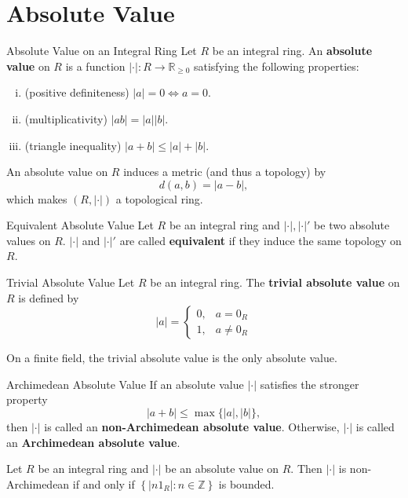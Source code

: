 \section{Absolute Value}
\begin{definition}{Absolute Value on an Integral Ring}{}
    Let $R$ be an integral ring. An \textbf{absolute value} on $R$ is a function $|\cdot|:R\to \mathbb{R}_{\ge0}$ satisfying the following properties:
    \begin{enumerate}[(i)]
        \item (positive definiteness) $|a|=0\iff a=0$.
        \item (multiplicativity) $|ab|=|a||b|$.
        \item (triangle inequality) $|a+b|\le |a|+|b|$.
    \end{enumerate}
\end{definition}

An absolute value on $R$ induces a metric (and thus a topology) by 
\[
    d(a,b)=|a-b|,
\]
which makes $(R,|\cdot|)$ a topological ring. 
\begin{definition}{Equivalent Absolute Value}{}
    Let $R$ be an integral ring and $|\cdot|,|\cdot|'$ be two absolute values on $R$. $|\cdot|$ and $|\cdot|'$ are called \textbf{equivalent} if they induce the same topology on $R$.
\end{definition}

\begin{definition}{Trivial Absolute Value}{}
    Let $R$ be an integral ring. The \textbf{trivial absolute value} on $R$ is defined by 
    \[
        |a|=\begin{cases}
            0, & a=0_R\\
            1, & a\ne 0_R
        \end{cases}
    \]
\end{definition}

On a finite field, the trivial absolute value is the only absolute value.
\begin{definition}{Archimedean Absolute Value}{}
    If an absolute value $|\cdot|$ satisfies the stronger property 
    \[
        |a+b|\le \max\{|a|,|b|\},
    \]
    then $|\cdot|$ is called an \textbf{non-Archimedean absolute value}. Otherwise, $|\cdot|$ is called an \textbf{Archimedean absolute value}.
\end{definition}

\begin{proposition}{}{}
    Let $R$ be an integral ring and $|\cdot|$ be an absolute value on $R$. Then $|\cdot|$ is non-Archimedean if and only if $\left\{ |n1_R|:n\in \mathbb{Z}\right\}$ is bounded.
\end{proposition}

